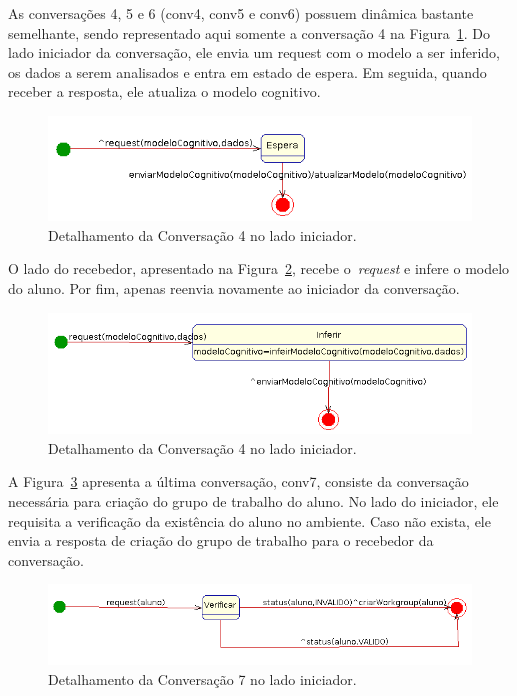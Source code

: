 As conversações 4, 5 e 6 (conv4, conv5 e conv6) possuem dinâmica bastante semelhante, sendo representado aqui somente a conversação 4 na Figura~\ref{fig:conv4-iniciador}. Do lado iniciador da conversação, ele envia um request com o modelo a ser inferido, os dados a serem analisados e entra em estado de espera. Em seguida, quando receber a resposta, ele atualiza o modelo cognitivo.
\begin{figure}
	\centering
	\includegraphics[scale=0.48]{images/conv4-iniciador.png}
	\caption{Detalhamento da Conversação 4 no lado iniciador.}
	\label{fig:conv4-iniciador}
\end{figure}

O lado do recebedor, apresentado na Figura~\ref{fig:conv4-recebedor}, recebe o~\emph{request} e infere o modelo do aluno. Por fim, apenas reenvia novamente ao iniciador da conversação.
\begin{figure}
	\centering
	\includegraphics[scale=0.48]{images/conv4-recebedor.png}
	\caption{Detalhamento da Conversação 4 no lado iniciador.}
	\label{fig:conv4-recebedor}
\end{figure}

A Figura~\ref{fig:conv7-iniciador} apresenta a última conversação, conv7, consiste da conversação necessária para criação do grupo de trabalho do aluno. No lado do iniciador, ele requisita a verificação da existência do aluno no ambiente. Caso não exista, ele envia a resposta de criação do grupo de trabalho para o recebedor da conversação.
\begin{figure}
	\centering
	\includegraphics[scale=0.48]{images/conv7-iniciador.png}
	\caption{Detalhamento da Conversação 7 no lado iniciador.}
	\label{fig:conv7-iniciador}
\end{figure}


